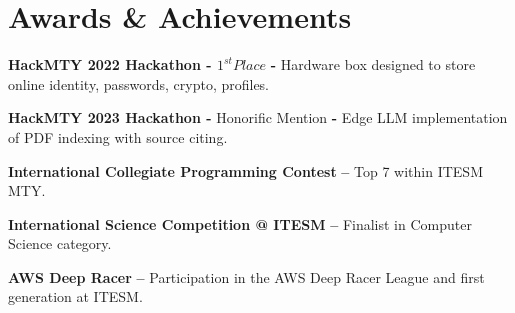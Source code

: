 \documentclass[letterpaper,11pt]{article}
\makeatletter
\newcommand{\resumeItem}[1]{
  \item\small{
    {#1 \vspace{-2pt}}
  }
}
\newcommand{\resumeProjectHeading}[2]{
    \vspace{-2pt}\item
    \begin{tabular*}{0.97\textwidth}{l@{\extracolsep{\fill}}r}
      \small#1 & #2 \\
    \end{tabular*}\vspace{-7pt}
}
\newcommand{\resumeSubHeadingListStart}{\begin{itemize}[leftmargin=0.15in, label={}]}
\newcommand{\resumeSubHeadingListEnd}{\end{itemize}}
\newcommand{\resumeItemListStart}{\begin{itemize}}
\newcommand{\resumeItemListEnd}{\end{itemize}\vspace{-5pt}}
\makeatother
\begin{document}
\section{Awards \& Achievements}
  \vspace{2pt}
  \resumeSubHeadingListStart
    \small{\item{
        \textbf{HackMTY 2022 Hackathon - $1^{st} Place$  } \textbf{-} { Hardware box designed to store online identity, passwords, crypto, profiles. } \\ \vspace{2pt}
        
        \textbf{HackMTY 2023 Hackathon - } Honorific Mention \textbf{-} { Edge LLM implementation of PDF indexing with source citing. } \\ \vspace{2pt}

        
	\textbf{International Collegiate Programming Contest} \textbf{--} { Top 7 within ITESM MTY. } \\ \vspace{2pt}
        
	\textbf{International Science Competition @ ITESM} \textbf{--} { Finalist in Computer Science category.} \\ \vspace{2pt}
	
	\textbf{AWS Deep Racer} \textbf{--} { Participation in the AWS Deep Racer League and first generation at ITESM.}
    }}
  \resumeSubHeadingListEnd




%       
%       
\end{document}
